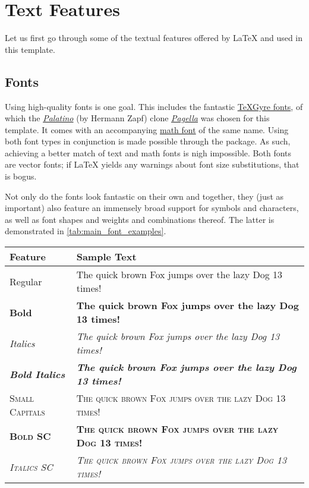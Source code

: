\chapter{Text Features}
Let us first go through some of the textual features offered by \LaTeX{} and used in this template.

\section{Fonts}
Using high-quality fonts is one goal.
This includes the fantastic \href{https://ctan.org/texarchive/fonts/tex-gyre/opentype}{\TeX Gyre fonts}, of which the \textit{\href{https://en.wikipedia.org/wiki/Palatino}{Palatino}} (by Hermann Zapf) clone \textit{\href{https://ctan.org/pkg/tex-gyre-pagella}{Pagella}} was chosen for this template.
It comes with an accompanying \href{https://ctan.org/texarchive/fonts/tex-gyre-math/opentype}{math font} of the same name.
Using both font types in conjunction is made possible through the  package.
As such, achieving a better match of text and math fonts is nigh impossible.
Both fonts are vector fonts; if \LaTeX{} yields any warnings about font size substitutions, that is bogus.

Not only do the fonts look fantastic on their own and together, they (just as important) also feature an immensely broad support for symbols and characters, as well as font shapes and weights and combinations thereof.
The latter is demonstrated in \cref{tab:main_font_examples}.
%
\newcommand*{\sampletext}{The quick brown Fox jumps over the lazy Dog 13 times!}
\begin{table}
%
{%
	\begin{tabular}{@{}ll@{}}%
		\toprule
			Feature & Sample Text\\
		\midrule
			Regular & \sampletext\\
			\textbf{Bold} & \textbf{\sampletext}\\
			\textit{Italics} & \textit{\sampletext}\\
			\textbf{\textit{Bold Italics}} & \textbf{\textit{\sampletext}}\\
		\addlinespace%
			\textsc{Small Capitals} & \textsc{\sampletext}\\
			\textbf{\textsc{Bold SC}} & \textbf{\textsc{\sampletext}}\\
			\textit{\textsc{Italics SC}} & \textit{\textsc{\sampletext}}\\
		\bottomrule
	\end{tabular}
}%
\end{table}

